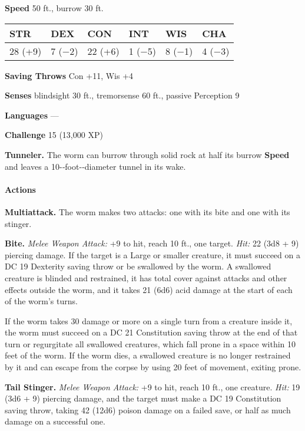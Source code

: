 \documentclass[
]{article}
\begin{document}
\textbf{Speed} 50 ft., burrow 30 ft.

\begin{longtable}[]{@{}llllll@{}}
\toprule
STR & DEX & CON & INT & WIS & CHA\tabularnewline
\midrule
\endhead
28 (+9) & 7 (−2) & 22 (+6) & 1 (−5) & 8 (−1) & 4 (−3)\tabularnewline
\bottomrule
\end{longtable}

\textbf{Saving Throws} Con +11, Wis +4

\textbf{Senses} blindsight 30 ft., tremorsense 60 ft., passive
Perception 9

\textbf{Languages} ---

\textbf{Challenge} 15 (13,000 XP)

\textbf{Tunneler.} The worm can burrow through solid rock at half its
burrow \textbf{Speed} and leaves a 10-­‐foot-­‐diameter tunnel in its
wake.

\hypertarget{actions-2}{%
\paragraph{Actions}\label{actions-2}}

\textbf{Multiattack.} The worm makes two attacks: one with its bite and
one with its stinger.

\textbf{Bite.} \emph{Melee Weapon Attack:} +9 to hit, reach 10 ft., one
target. \emph{Hit:} 22 (3d8 + 9) piercing damage. If the target is a
Large or smaller creature, it must succeed on a DC 19 Dexterity saving
throw or be swallowed by the worm. A swallowed creature is blinded and
restrained, it has total cover against attacks and other effects outside
the worm, and it takes 21 (6d6) acid damage at the start of each of the
worm's turns.

If the worm takes 30 damage or more on a single turn from a creature
inside it, the worm must succeed on a DC 21 Constitution saving throw at
the end of that turn or regurgitate all swallowed creatures, which fall
prone in a space within 10 feet of the worm. If the worm dies, a
swallowed creature is no longer restrained by it and can escape from the
corpse by using 20 feet of movement, exiting prone.

\textbf{Tail Stinger.} \emph{Melee Weapon Attack:} +9 to hit, reach 10
ft., one creature. \emph{Hit:} 19 (3d6 + 9) piercing damage, and the
target must make a DC 19 Constitution saving throw, taking 42 (12d6)
poison damage on a failed save, or half as much damage on a successful
one.
\end{document}
